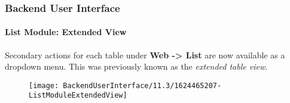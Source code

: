 %

\begin{frame}[fragile]
	\frametitle{Backend User Interface}
	\framesubtitle{List Module: Extended View}

	Secondary actions for each table under \textbf{Web -> List} are now available
	as a dropdown menu. This was previously known as the \textit{extended table view}.

	\begin{figure}
		\texttt{[image: BackendUserInterface/11.3/1624465207-ListModuleExtendedView]}
	\end{figure}

\end{frame}

